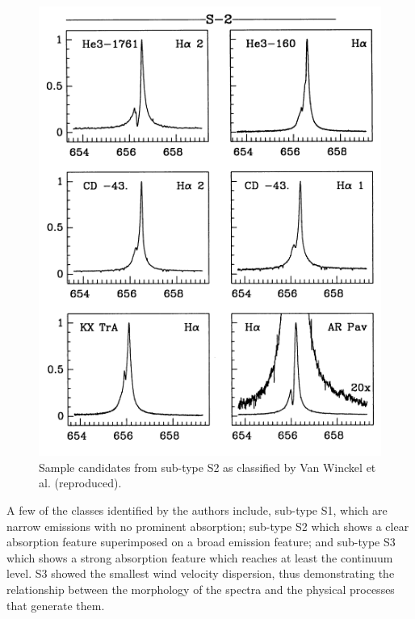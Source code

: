 \begin{figure}[!htb]
\centering
\includegraphics[scale=0.75]{figures/van.png}
\caption{Sample candidates from sub-type S2 as classified by Van Winckel et al. (reproduced).}
\end{figure}

A few of the classes identified by the authors include, sub-type S1, which are narrow emissions with no prominent absorption; sub-type S2 which shows a clear absorption feature superimposed on a broad emission feature; and sub-type S3 which shows a strong absorption feature which reaches at least the continuum level. S3 showed the smallest wind velocity dispersion, thus demonstrating the relationship between the morphology of the spectra and the physical processes that generate them.

